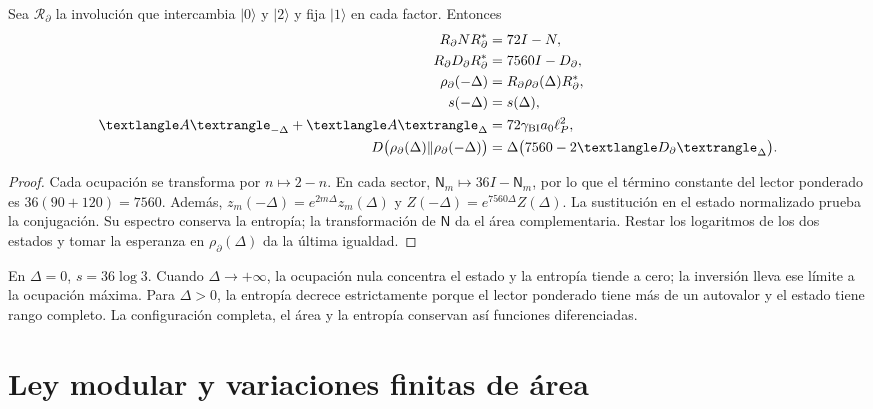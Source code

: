 \begin{theorem}
\label{x_reciprocidad:vii:thm:inversion-sectorial}
Sea \(\mathcal R_\partial\) la involución que intercambia
\(|0\rangle\) y \(|2\rangle\) y fija \(|1\rangle\) en cada
factor. Entonces
\begin{align}
 \mathcal R_\partial\mathsf N\mathcal R_\partial^*&=72I-\mathsf N,\\
 \mathcal R_\partial\mathsf D_\partial\mathcal R_\partial^*
 &=7560I-\mathsf D_\partial,\\
 \rho_\partial(-\Delta)&=\mathcal R_\partial\rho_\partial(\Delta)
                          \mathcal R_\partial^*,\\
 s(-\Delta)&=s(\Delta),\\
 \langle\widehat{\mathcal A}\rangle_{-\Delta}
 +\langle\widehat{\mathcal A}\rangle_\Delta
 &=72\gamma_{\rm BI}a_0\ell_P^2,\\
 \mathcal D\bigl(\rho_\partial(\Delta)\Vert\rho_\partial(-\Delta)\bigr)
 &=\Delta\bigl(7560-2\langle\mathsf D_\partial\rangle_\Delta\bigr).
 \label{x_reciprocidad:vii:eq:inversion-sectorial}
\end{align}
\end{theorem}
\begin{proof}
Cada ocupación se transforma por \(n\mapsto2-n\). En cada sector,
\(\mathsf N_m\mapsto36I-\mathsf N_m\), por lo que el término
constante del lector ponderado es \(36(90+120)=7560\).
Además, \(z_m(-\Delta)=e^{2m\Delta}z_m(\Delta)\) y
\(Z(-\Delta)=e^{7560\Delta}Z(\Delta)\). La sustitución en el
estado normalizado prueba la conjugación. Su espectro conserva la entropía;
la transformación de \(\mathsf N\) da el área complementaria. Restar
los logaritmos de los dos estados y tomar la esperanza en
\(\rho_\partial(\Delta)\) da la última igualdad.
\end{proof}

En \(\Delta=0\), \(s=36\log3\). Cuando \(\Delta\to+\infty\),
la ocupación nula concentra el estado y la entropía tiende a cero;
la inversión lleva ese límite a la ocupación máxima. Para \(\Delta>0\),
la entropía decrece estrictamente porque el lector ponderado tiene más
de un autovalor y el estado tiene rango completo. La configuración
completa, el área y la entropía conservan así funciones diferenciadas.

\section{Ley modular y variaciones finitas de área}
\label{x_reciprocidad:vii:subsec:ley-modular-finita}

